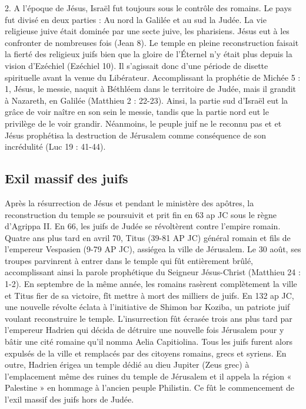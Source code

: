 2. A l'époque de Jésus, Israël fut toujours sous le contrôle des romains. Le pays fut divisé en deux parties : Au nord la Galilée et au sud la Judée. La vie religieuse juive était dominée par une secte juive, les pharisiens. Jésus eut à les confronter de nombreuses fois (Jean 8). Le temple en pleine reconstruction faisait la fierté des religieux juifs bien que la gloire de l’Éternel n'y était plus depuis la vision d'Ezéchiel (Ezéchiel 10). Il s'agissait donc d'une période de disette spirituelle avant la venue du Libérateur. Accomplissant la prophétie de Michée 5 : 1, Jésus, le messie, naquit à Béthléem dans le territoire de Judée, mais il grandit à Nazareth, en Galilée (Matthieu 2 : 22-23). Ainsi, la partie sud d'Israël eut la grâce de voir naître en son sein le messie, tandis que la partie nord eut le privilège de le voir grandir. Néanmoins, le peuple juif ne le reconnu pas et et Jésus prophétisa la destruction de Jérusalem comme conséquence de son incrédulité (Luc 19 : 41-44).

\subsection*{Exil massif des juifs}

Après la résurrection de Jésus et pendant le ministère des apôtres, la reconstruction du temple se poursuivit et prit fin en 63 ap JC sous le règne d'Agrippa II. En 66, les juifs de Judée se révoltèrent contre l'empire romain. Quatre ans plus tard en avril 70, Titus (39-81 AP JC) général romain et fils de l'empereur Vespasien (9-79 AP JC), assiégea la ville de Jérusalem. Le 30 août, ses troupes parvinrent à entrer dans le temple qui fût entièrement brûlé, accomplissant ainsi la parole prophétique du Seigneur Jésus-Christ (Matthieu 24 : 1-2). En septembre de la même année, les romains rasèrent complètement la ville et Titus fier de sa victoire, fît mettre à mort des milliers de juifs.
En 132 ap JC, une nouvelle révolte éclata à l'initiative de Shimon bar Koziba, un patriote juif voulant reconstruire le temple. L'insurrection fût écrasée trois ans plus tard par l'empereur Hadrien qui décida de détruire une nouvelle fois Jérusalem pour y bâtir une cité romaine qu'il nomma Aelia Capitiolina. Tous les juifs furent alors expulsés de la ville et remplacés par des citoyens romains, grecs et syriens. En outre, Hadrien érigea un temple dédié au dieu Jupiter (Zeus grec) à l'emplacement même des ruines du temple de Jérusalem et il appela la région « Palestine » en hommage à l'ancien peuple Philistin. Ce fût le commencement de l'exil massif des juifs hors de Judée.

